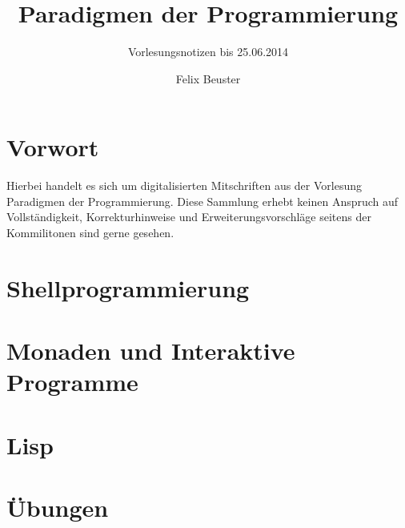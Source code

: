 \documentclass[11pt,a4paper]{scrartcl}
\title{Paradigmen der Programmierung}
\subtitle{Vorlesungsnotizen bis 25.06.2014}
\author{Felix Beuster}
\date{}
\begin{document}
\setlength{\parindent}{0ex}
\maketitle
\newpage
\tableofcontents
\newpage

\section*{Vorwort} %
\label{sec:vorwort}

	Hierbei handelt es sich um digitalisierten Mitschriften aus der Vorlesung Paradigmen der
	Programmierung. Diese Sammlung erhebt keinen Anspruch auf Vollständigkeit, Korrekturhinweise
	und Erweiterungsvorschläge seitens der Kommilitonen sind gerne gesehen.


\section{Shellprogrammierung} %
\label{sec:shellprogrammierung}

\clearpage
\section{Monaden und Interaktive Programme} %
\label{sec:monaden_und_interaktive_programme}

\clearpage
\section{Lisp} %
\label{sec:lisp}
	
	
	




\clearpage
\appendix
\section{Übungen} %
\label{sec:uebungen}
\end{document}
